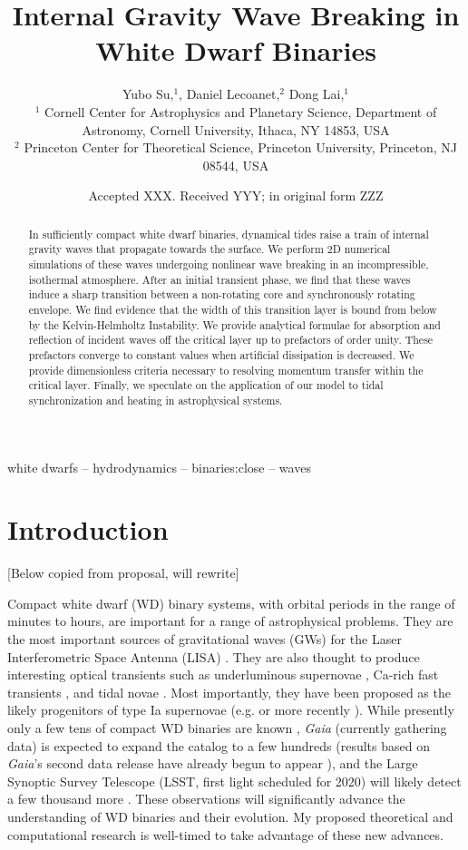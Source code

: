 \documentclass[
        fleqn,
        usenatbib,
    ]{mnras}
\title[Internal Gravity Wave Breaking in White Dwarf Binaries]{Internal Gravity Wave Breaking in White Dwarf Binaries}
\author[Y. Su et\ al.]{
Yubo Su,$^1$,
Daniel Lecoanet,$^2$
Dong Lai,$^1$
\\
$^1$ Cornell Center for Astrophysics and Planetary Science, Department of
Astronomy, Cornell University, Ithaca, NY 14853, USA
\\
$^2$ Princeton Center for Theoretical Science, Princeton University, Princeton,
NJ 08544, USA
}
\date{Accepted XXX\@. Received YYY\@; in original form ZZZ}
\begin{document}
\label{firstpage}
\pagerange{\pageref{firstpage}--\pageref{lastpage}}
\renewcommand*{\sectionautorefname}{Section}
\maketitle


\begin{abstract}
    In sufficiently compact white dwarf binaries, dynamical tides raise a train
    of internal gravity waves that propagate towards the surface. We perform 2D
    numerical simulations of these waves undergoing nonlinear wave breaking in
    an incompressible, isothermal atmosphere. After an initial transient phase,
    we find that these waves induce a sharp transition between a non-rotating
    core and synchronously rotating envelope. We find evidence that the width of
    this transition layer is bound from below by the Kelvin-Helmholtz
    Instability. We provide analytical formulae for absorption and reflection of
    incident waves off the critical layer up to prefactors of order unity. These
    prefactors converge to constant values when artificial dissipation is
    decreased. We provide dimensionless criteria necessary to resolving momentum
    transfer within the critical layer. Finally, we speculate on the application
    of our model to tidal synchronization and heating in astrophysical systems.
\end{abstract}

\begin{keywords}
white dwarfs -- hydrodynamics -- binaries:close -- waves %
\end{keywords}

\section{Introduction}

[Below copied from proposal, will rewrite]

Compact white dwarf (WD) binary systems, with orbital periods in the range of
minutes to hours, are important for a range of astrophysical problems. They are
the most important sources of gravitational waves (GWs) for the Laser
Interferometric Space Antenna (LISA) \citep{lisa}. They are also thought to
produce interesting optical transients such as underluminous
supernovae \citep{underlum}, Ca-rich fast transients \citep{carich}, and tidal
novae \citep{tidal_novae}. Most importantly, they have been proposed as the likely
progenitors of type Ia supernovae (e.g. \citep{Ia0,webbink} or more
recently \citep{Ia1,Ia2}). While presently only a few tens of compact WD binaries
are known \citep{lsst_wd}, \emph{Gaia} (currently gathering data) is expected to
expand the catalog to a few hundreds \citep{lsst_wd} (results based on
\emph{Gaia}'s second data release have already begun to
appear \citep{gaiaDD,gaiaDD2}), and the Large Synoptic Survey Telescope (LSST,
first light scheduled for 2020) will likely detect a few thousand
more \citep{lsst_wd}. These observations will significantly advance the
understanding of WD binaries and their evolution. My proposed theoretical and
computational research is well-timed to take advantage of these new advances.
\end{document}
